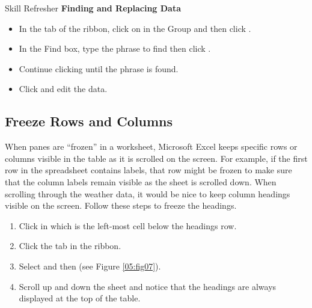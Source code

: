 \begin{center}
	\begin{sklbox}{Skill Refresher}
		\textbf{Finding and Replacing Data}
		\\
		\begin{itemize}
			\setlength{\itemsep}{0pt}
			\setlength{\parskip}{0pt}
			\setlength{\parsep}{0pt}

			\item In the  tab of the ribbon, click on  in the  Group and then click .
			\item In the Find box, type the phrase to find then click .
			\item Continue clicking  until the phrase is found.
			\item Click  and edit the data.
			
		\end{itemize}
	\end{sklbox}
\end{center}

\subsection{Freeze Rows and Columns}

When panes are ``frozen'' in a worksheet, Microsoft Excel keeps specific rows or columns visible in the table as it is scrolled on the screen. For example, if the first row in the spreadsheet contains labels, that row might be frozen to make sure that the column labels remain visible as the sheet is scrolled down. When scrolling through the weather data, it would be nice to keep column headings visible on the screen. Follow these steps to freeze the headings.

\begin{enumerate}
	\item Click in  which is the left-most cell below the headings row.
	\item Click the  tab in the ribbon.
	\item Select  and then  (see Figure \ref{05:fig07}).
	\item Scroll up and down the sheet and notice that the headings are always displayed at the top of the table.
\end{enumerate}

